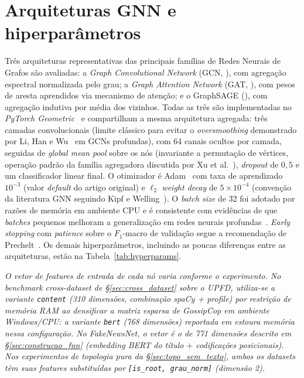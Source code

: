 \section{Arquiteturas GNN e hiperpar\^ametros}
\label{sec:arquiteturas}

Tr\^es arquiteturas representativas das principais fam\'ilias de Redes
Neurais de Grafos s\~ao avaliadas: a \emph{Graph Convolutional Network}
(GCN, \cite{kipf2017gcn}), com agrega\c{c}\~ao espectral normalizada pelo
grau; a \emph{Graph Attention Network} (GAT, \cite{velickovic2018gat}),
com pesos de aresta aprendidos via mecanismo de aten\c{c}\~ao; e o
GraphSAGE (\cite{hamilton2017graphsage}), com agrega\c{c}\~ao indutiva por
m\'edia dos vizinhos. Todas as tr\^es s\~ao implementadas no \emph{PyTorch
Geometric}~\cite{fey2019pyg} e compartilham a mesma arquitetura agregada:
tr\^es camadas convolucionais (limite cl\'assico para evitar o
\emph{oversmoothing} demonstrado por Li, Han e
Wu~\cite{li2018deeper} em GCNs profundas), com 64 canais ocultos
por camada, seguidas de \emph{global mean pool} sobre os n\'os
(invariante a permuta\c{c}\~ao de v\'ertices, opera\c{c}\~ao padr\~ao da
fam\'ilia agregadora discutida por Xu et al.~\cite{xu2019gin}),
\emph{dropout} de $0{,}5$ \cite{srivastava2014dropout} e um classificador
linear final. O otimizador \'e Adam~\cite{kingma2015adam} com taxa de
aprendizado $10^{-3}$ (valor \emph{default} do artigo original) e
$\ell_2$ \emph{weight decay} de $5 \times 10^{-4}$ (conven\c{c}\~ao da
literatura GNN seguindo Kipf e Welling~\cite{kipf2017gcn}). O
\emph{batch size} de 32 foi adotado por raz\~oes de mem\'oria em
ambiente CPU e \'e consistente com evid\^encias de que \emph{batches}
pequenos melhoram a generaliza\c{c}\~ao em redes neurais
profundas~\cite{masters2018batch}. \emph{Early stopping} com
\emph{patience} sobre o $F_1$-macro de valida\c{c}\~ao segue a
recomenda\c{c}\~ao de Prechelt~\cite{prechelt1998early}. Os demais
hiperpar\^ametros, incluindo as poucas diferen\c{c}as entre as
arquiteturas, est\~ao na Tabela~\ref{tab:hyperparams}.

\textit{O vetor de \emph{features} de entrada de cada n\'o varia
conforme o experimento. No benchmark \emph{cross-dataset} de
\S\ref{sec:cross_dataset} sobre o UPFD, utiliza-se a variante
\texttt{content} (310 dimens\~oes, combina\c{c}\~ao \emph{spaCy} +
\emph{profile}) por restri\c{c}\~ao de mem\'oria RAM ao densificar a
matriz esparsa de GossipCop em ambiente Windows/CPU: a variante
\texttt{bert} (768 dimens\~oes) reportada em \cite{dou2021upfd}
estoura mem\'oria nessa configura\c{c}\~ao. No FakeNewsNet, o vetor \'e
o de 771 dimens\~oes descrito em \S\ref{sec:construcao_fnn}
(\emph{embedding} BERT do t\'itulo $+$ codifica\c{c}\~oes posicionais).
Nos experimentos de topologia pura da \S\ref{sec:topo_sem_texto},
ambos os \emph{datasets} t\^em suas \emph{features} substitu\'idas por
\texttt{[is\_root, grau\_norm]} (dimens\~ao 2).}


